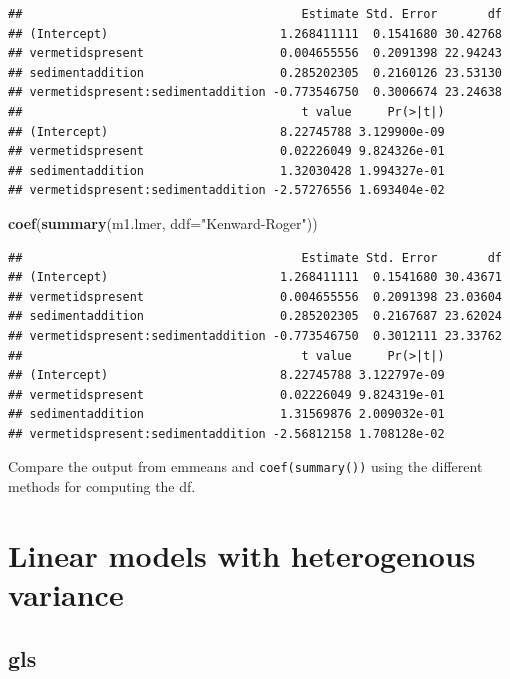 \documentclass[]{book}
\newenvironment{Shaded}{\begin{snugshade}}{\end{snugshade}}
\newcommand{\KeywordTok}[1]{\textcolor[rgb]{0.13,0.29,0.53}{\textbf{#1}}}
\newcommand{\DataTypeTok}[1]{\textcolor[rgb]{0.13,0.29,0.53}{#1}}
\newcommand{\StringTok}[1]{\textcolor[rgb]{0.31,0.60,0.02}{#1}}
\newcommand{\NormalTok}[1]{#1}
\begin{document}
\begin{verbatim}
##                                       Estimate Std. Error       df
## (Intercept)                        1.268411111  0.1541680 30.42768
## vermetidspresent                   0.004655556  0.2091398 22.94243
## sedimentaddition                   0.285202305  0.2160126 23.53130
## vermetidspresent:sedimentaddition -0.773546750  0.3006674 23.24638
##                                       t value     Pr(>|t|)
## (Intercept)                        8.22745788 3.129900e-09
## vermetidspresent                   0.02226049 9.824326e-01
## sedimentaddition                   1.32030428 1.994327e-01
## vermetidspresent:sedimentaddition -2.57276556 1.693404e-02
\end{verbatim}

\begin{Shaded}
\begin{Highlighting}[]
\KeywordTok{coef}\NormalTok{(}\KeywordTok{summary}\NormalTok{(m1.lmer, }\DataTypeTok{ddf=}\StringTok{"Kenward-Roger"}\NormalTok{))}
\end{Highlighting}
\end{Shaded}

\begin{verbatim}
##                                       Estimate Std. Error       df
## (Intercept)                        1.268411111  0.1541680 30.43671
## vermetidspresent                   0.004655556  0.2091398 23.03604
## sedimentaddition                   0.285202305  0.2167687 23.62024
## vermetidspresent:sedimentaddition -0.773546750  0.3012111 23.33762
##                                       t value     Pr(>|t|)
## (Intercept)                        8.22745788 3.122797e-09
## vermetidspresent                   0.02226049 9.824319e-01
## sedimentaddition                   1.31569876 2.009032e-01
## vermetidspresent:sedimentaddition -2.56812158 1.708128e-02
\end{verbatim}

Compare the output from emmeans and \texttt{coef(summary())} using the
different methods for computing the df.

\chapter{Linear models with heterogenous
variance}\label{linear-models-with-heterogenous-variance}

\section{gls}\label{gls}
\end{document}
